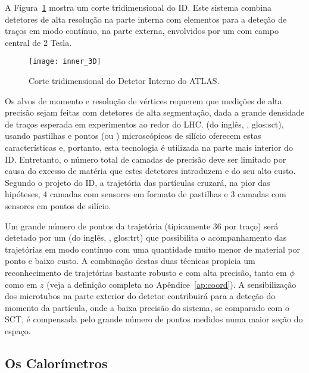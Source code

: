 A Figura~\ref{fig:atlas-id-3d} mostra um corte tridimensional do ID. Este
sistema combina detetores de alta resolução na parte interna com elementos
para a deteção de traços em modo contínuo, na parte externa, envolvidos por um
 com campo central de 2 Tesla.

\begin{figure}
\begin{center}
\texttt{[image: inner\_3D]}
\end{center}
\caption{Corte tridimensional do Detetor Interno do ATLAS.}
\label{fig:atlas-id-3d}
\end{figure}

Os alvos de momento e resolução de vértices requerem que medições de alta
precisão sejam feitas com detetores de alta segmentação, dada a grande
densidade de traços esperada em experimentos ao redor do LHC.  (do inglês, , \gls{glos:sct}), usando pastilhas e
pontos (ou ) microscópicos de silício
oferecem estas características e, portanto, esta tecnologia é utilizada na
parte mais interior do ID. Entretanto, o número total de camadas de precisão
deve ser limitado por causa do excesso de matéria que estes detetores
introduzem e do seu alto custo. Segundo o projeto do ID, a trajetória das
partículas cruzará, na pior das hipóteses, 4 camadas com sensores em formato
de pastilhas e 3 camadas com sensores em pontos de silício.

Um grande número de pontos da trajetória (tipicamente 36 por traço) será
detetado por um  (do inglês,
, \gls{glos:trt}) que possibilita o
acompanhamento das trajetórias em modo contínuo com uma quantidade muito menor
de material por ponto e baixo custo. A combinação destas duas técnicas
propicia um reconhecimento de trajetórias bastante robusto e com alta
precisão, tanto em $\phi$ como em $z$ (veja a definição completa no
Apêndice~\ref{ap:coord}). A sensibilização dos microtubos na parte exterior do
detetor contribuirá para a deteção do momento da partícula, onde a baixa
precisão do sistema, se comparado com o SCT, é compensada pelo grande número
de pontos medidos numa maior seção do espaço.

\subsection{Os Calorímetros}
\label{sec:atlas-calo}

